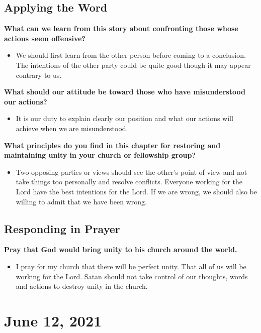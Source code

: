 \documentclass[11pt]{article}
\begin{document}
\subsection{Applying the Word}
\label{sec:orge9f8055}

\textbf{\textbf{What can we learn from this story about confronting those whose actions seem offensive?}}
\begin{itemize}
\item We should first learn from the other person before coming to a conclusion. The intentions of the other party could be quite good though it may appear contrary to us.
\end{itemize}

\textbf{\textbf{What should our attitude be toward those who have misunderstood our actions?}}
\begin{itemize}
\item It is our duty to explain clearly our position and what our actions will achieve when we are misunderstood.
\end{itemize}

\textbf{\textbf{What principles do you find in this chapter for restoring and maintaining unity in your church or fellowship group?}}
\begin{itemize}
\item Two opposing parties or views should see the other's point of view and not take things too personally and resolve conflicts. Everyone working for the Lord have the best intentions for the Lord. If we are wrong, we should also be willing to admit that we have been wrong.
\end{itemize}

\subsection{Responding in Prayer}
\label{sec:org1325fbb}

\textbf{\textbf{Pray that God would bring unity to his church around the world.}}
\begin{itemize}
\item I pray for my church that there will be perfect unity. That all of us will be working for the Lord. Satan should not take control of our thoughts, words and actions to destroy unity in the church.
\end{itemize}


\section{June 12, 2021}
\label{sec:orge2d1c22}
\end{document}
